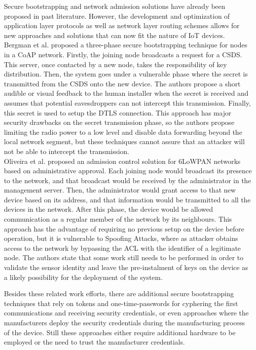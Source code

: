 \documentclass{sig-alternate-05-2015}
\begin{document}
Secure bootstrapping and network admission solutions have already been proposed in past literature. 
However, the development and optimization of application layer protocols as well as network layer routing schemes allows for new approaches and solutions that can now fit the nature of \gls{IoT} devices.
Bergman et al.\cite{Bergmann2012} proposed a three-phase secure bootstrapping technique for nodes in a \gls{CoAP} network. 
Firstly, the joining node broadcasts a request for a \gls{CSDS}. 
This server, once contacted by a new node, takes the responsibility of key distribution. 
Then, the system goes under a vulnerable phase where the secret is transmitted from the \gls{CSDS} onto the new device. 
The authors propose a short audible or visual feedback to the human installer when the secret is received and assumes that potential eavesdroppers can not intercept this transmission. 
Finally, this secret is used to setup the \gls{DTLS} connection. 
This approach has major security drawbacks on the secret transmission phase, so the authors propose limiting the radio power to a low level and disable data forwarding beyond the local network segment, but these techniques cannot assure that an attacker will not be able to intercept the transmission.\\
Oliveira et al. \cite{Oliveira2013} proposed an admission control solution for 6LoWPAN networks based on administrative approval. 
Each joining node would broadcast its presence to the network, and that broadcast would be received by the administrator in the management server. 
Then, the administrator would grant access to that new device based on its address, and that information would be transmitted to all the devices in the network. 
After this phase, the device would be allowed communication as a regular member of the network by its neighbours. 
This approach has the advantage of requiring no previous setup on the device before operation, but it is vulnerable to Spoofing Attacks, where as attacker obtains access to the network by bypassing the \gls{ACL} with the identifier of a legitimate node.
The authors state that some work still needs to be performed in order to validate the sensor identity and leave the pre-instalment of keys on the device as a likely possibility for the deployment of the system. 

Besides these related work efforts, there are additional secure bootstrapping techniques \cite{Fischer2012} that rely on tokens and one-time-passwords for cyphering the first communications and receiving security credentials, or even approaches where the manufacturers deploy the security credentials during the manufacturing process of the device. 
Still these approaches either require additional hardware to be employed or the need to trust the manufacturer credentials.\\
\end{document}
